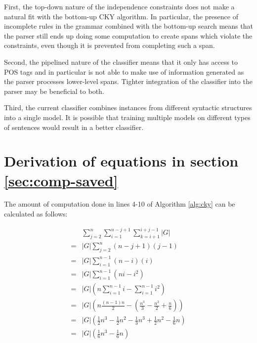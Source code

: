 \documentclass[11pt]{article}
\begin{document}
First, the top-down nature of the independence constraints does not
make a natural fit with the bottom-up CKY algorithm. In particular,
the presence of incomplete rules in the grammar combined with the
bottom-up search means that the parser still ends up doing some
computation to create spans which violate the constraints, even though
it is prevented from completing such a span.

Second, the pipelined nature of the classifier means that it only has
access to POS tags and in particular is not able to make use of
information generated as the parser processes lower-level spans.
Tighter integration of the classifier into the parser may be
beneficial to both.

Third, the current classifier combines instances from different
syntactic structures into a single model. It is possible that training
multiple models on different types of sentences would result in a
better classifier.

\appendix
\label{sec-8}

\section{Derivation of equations in section \ref{sec:comp-saved}}
\label{sec:derivation-equations}

The amount of computation done in lines 4-10 of Algorithm \ref{alg:cky} can be calculated as follows:

{\small
\begin{align*}
& \sum_{j=2}^{n}\sum_{i=1}^{n-j+1}\sum_{k=i+1}^{i+j-1}|G|\\
=& |G|\sum_{j=2}^{n}(n-j+1)(j-1)\\
=& |G|\sum_{i=1}^{n-1}(n-i)(i)\\
=& |G|\sum_{i=1}^{n-1}(ni - i^2)\\
=& |G|(n\sum_{i=1}^{n-1}i - \sum_{i=1}^{n-1}i^2)\\
=& |G|(n\frac{(n-1)n}{2} - (\frac{n^3}{3} - \frac{n^2}{2} + \frac{n}{6}))\\
=& |G|(\frac{1}{2}n^3 - \frac{1}{2}n^2 - \frac{1}{3}n^3 + \frac{1}{2}n^2 - \frac{1}{6}n)\\
=& |G|(\frac{1}{6}n^3 - \frac{1}{6}n)
\end{align*}
}
\end{document}
